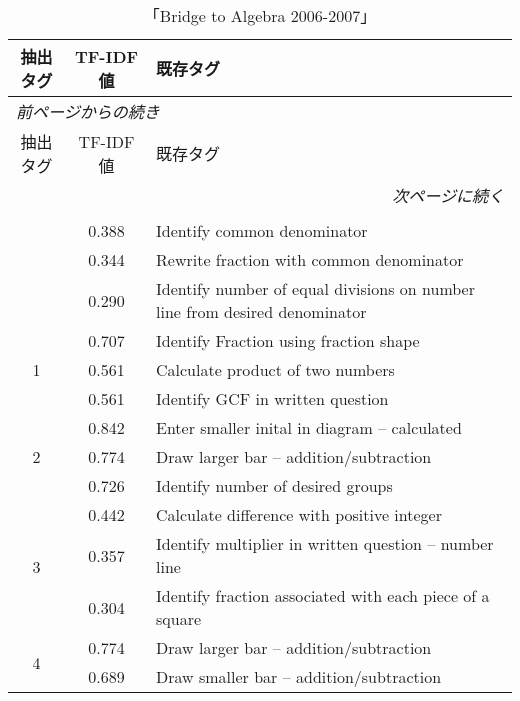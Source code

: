 \begin{longtable}[c]{|c|c|l|}
\caption{「Bridge to Algebra 2006-2007」}
\label{tab:result1}
\\
\hline
抽出タグ &  TF-IDF値　& 既存タグ\\
\hline
\hline
\endfirsthead
\multicolumn{3}{l}{\small\it 前ページからの続き}\\
\hline
抽出タグ &  TF-IDF値　& 既存タグ\\
\hline
\hline
\endhead
\hline
\multicolumn{3}{r}{\small\it 次ページに続く}\\
\endfoot
\hline
\multicolumn{3}{r}{\small\it 以上}\\
\endlastfoot
\multirow{3}{*}{\small 0} & \small 0.388 & \small Identify common denominator \\
 & \small 0.344 & \small Rewrite fraction with common denominator \\
 & \small 0.290 & \small Identify number of equal divisions on number line from desired denominator \\
\hline
\multirow{3}{*}{\small 1} & \small 0.707 & \small Identify Fraction using fraction shape \\
 & \small 0.561 & \small Calculate product of two numbers \\
 & \small 0.561 & \small Identify GCF in written question \\
\hline
\multirow{3}{*}{\small 2} & \small 0.842 & \small Enter smaller inital in diagram -- calculated \\
 & \small 0.774 & \small Draw larger bar -- addition/subtraction \\
 & \small 0.726 & \small Identify number of desired groups \\
\hline
\multirow{3}{*}{\small 3} & \small 0.442 & \small Calculate difference with positive integer \\
 & \small 0.357 & \small Identify multiplier in written question -- number line \\
 & \small 0.304 & \small Identify fraction associated with each piece of a square \\
\hline
\multirow{3}{*}{\small 4} & \small 0.774 & \small Draw larger bar -- addition/subtraction \\
 & \small 0.689 & \small Draw smaller bar -- addition/subtraction \\

\end{longtable}
